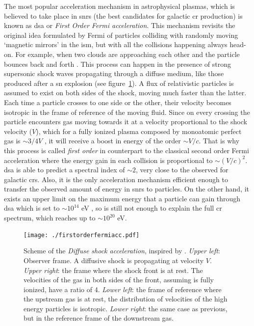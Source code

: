 \documentclass[main.tex]{subfiles}
\begin{document}
The most popular acceleration mechanism in astrophysical plasmas, which is believed to take place in \glspl{snr} (the best candidates for galactic \gls{cr} production) is known as \gls{dsa} or \textit{First Order Fermi acceleration}. This mechanism revisits the original idea formulated by Fermi of particles colliding with randomly moving `magnetic mirrors' in the \gls{ism}, but with all the collisions happening always head-on. For example, when two clouds are approaching each other and the particle bounces back and forth \cite{2009accelerationmech}. 
This process can happen in the presence of strong supersonic shock waves propagating through a diffuse medium, like those produced after a \gls{sn} explosion (see figure~\ref{fig:shock}). 
A flux of relativistic particles is assumed to exist on both sides of the shock, moving much faster than the latter. Each time a particle crosses to one side or the other, their velocity becomes isotropic in the frame of reference of the moving fluid. Since on every crossing the particle encounters gas moving towards it at a velocity proportional to the shock velocity ($V$), which for a fully ionized plasma composed by monoatomic perfect gas is $\sim 3/4 V$ \cite{highenergyastrophy}, it will receive a boost in energy of the order $\sim V/c$. That is why this process is called \textit{first order} in counterpart to the classical second order Fermi acceleration where the energy gain in each collision is proportional to $\sim (V/c)^{2}$.  
\gls{dsa} is able to predict a spectral index of $\sim 2$, very close to the observed for galactic \glspl{cr}. Also, it is the only acceleration mechanism efficient enough to transfer the observed amount of energy in \glspl{snr} to particles.
On the other hand, it exists an upper limit on the maximum energy that a particle can gain through \gls{dsa} which is set to $\sim 10^{14}$ eV \cite{1983maximumEinSNR}, so is still not enough to explain the full \gls{cr} spectrum, which reaches up to $\sim 10^{20}$ eV.
\begin{figure}[h]
\centering
 \texttt{[image: ./firstorderfermiacc.pdf]}
  \caption{Scheme of the \textit{Diffuse shock acceleration}, inspired by \cite{highenergyastrophy}. \textit{Upper left}: Observer frame. A diffusive shock is propagating at velocity $V$. \textit{Upper right}: the frame where the shock front is at rest. The velocities of the gas in both sides of the front, assuming is fully ionized, have a ratio of 4. \textit{Lower left}: the frame of reference where the upstream gas is at rest, the distribution of velocities of the high energy particles is isotropic. \textit{Lower right}: the same case as previous, but in the reference frame of the downstream gas.}
    \label{fig:shock}
\end{figure}
\end{document}
